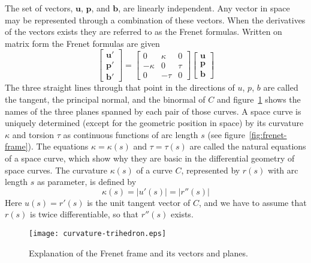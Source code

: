 The set of vectors, $\mathbf{u}$, $\mathbf{p}$, and $\mathbf{b}$, are
linearly independent. Any vector in space may be represented through a
combination of these vectors. When the derivatives of the vectors
exists they are referred to as the Frenet formulas. Written on matrix form
the Frenet formulas are given
\begin{equation}
  \label{eq:frenet-matrix}
  \begin{bmatrix}
    \mathbf{u}' \\
    \mathbf{p}' \\
    \mathbf{b}'
  \end{bmatrix}
  =
  \begin{bmatrix}
    0       & \kappa   & 0       \\
    -\kappa & 0        & \tau    \\
    0       & -\tau    & 0 
  \end{bmatrix}
  \begin{bmatrix}
    \mathbf{u} \\
    \mathbf{p} \\
    \mathbf{b}
  \end{bmatrix}
\end{equation}
The three straight lines through that point in the directions of $u$,
$p$, $b$ are called the tangent, the principal normal, and the
binormal of $C$ and figure~\ref{fig:trihedron} shows the names of the
three planes spanned by each pair of those curves.  A space curve is
uniquely determined (except for the geometric position in space) by
its curvature $\kappa$ and torsion $\tau$ as continuous functions of
arc length $s$ (see figure~\ref{fig:frenet-frame}). The equations
$\kappa = \kappa(s)$ and $\tau = \tau(s)$ are called the natural
equations of a space curve, which show why they are basic in the
differential geometry of space curves.  The curvature $\kappa(s)$ of a
curve $C$, represented by $r(s)$ with arc length $s$ as parameter, is
defined by
\begin{equation}
  \kappa(s) = \lvert u'(s)\rvert = \lvert r''(s)\rvert
\end{equation}
Here $u(s) = r'(s)$ is the unit tangent vector of $C$, and we have to
assume that $r(s)$ is twice differentiable, so that $r''(s)$ exists.

\begin{figure}[htbp]
  \centering
  \texttt{[image: curvature-trihedron.eps]}
  \caption{Explanation of the Frenet frame and its vectors and planes.}
  \label{fig:trihedron}
\end{figure}

